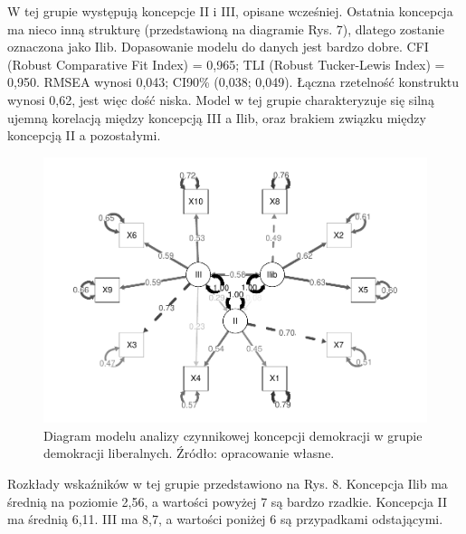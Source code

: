 \documentclass[12pt]{article}
\begin{document}
W tej grupie występują koncepcje II i III, opisane wcześniej. Ostatnia koncepcja ma nieco inną strukturę (przedstawioną na diagramie Rys. 7), dlatego zostanie oznaczona jako Ilib. Dopasowanie modelu do danych jest bardzo dobre. CFI (Robust Comparative Fit Index) = 0,965; TLI (Robust Tucker-Lewis Index) = 0,950. RMSEA wynosi 0,043; CI90\% (0,038; 0,049). Łączna rzetelność konstruktu wynosi 0,62, jest więc dość niska. Model w tej grupie charakteryzuje się silną ujemną korelacją między koncepcją III a Ilib, oraz brakiem związku między koncepcją II a pozostałymi.

\begin{figure}

{\centering \includegraphics{text_ASA_files/figure-latex/diagram-west-1} 

}

\caption{Diagram modelu analizy czynnikowej koncepcji demokracji w grupie demokracji liberalnych. Źródło: opracowanie własne.}\label{fig:diagram-west}
\end{figure}

Rozkłady wskaźników w tej grupie przedstawiono na Rys. 8. Koncepcja Ilib ma średnią na poziomie 2,56, a wartości powyżej 7 są bardzo rzadkie. Koncepcja II ma średnią 6,11. III ma 8,7, a wartości poniżej 6 są przypadkami odstającymi.
\end{document}
